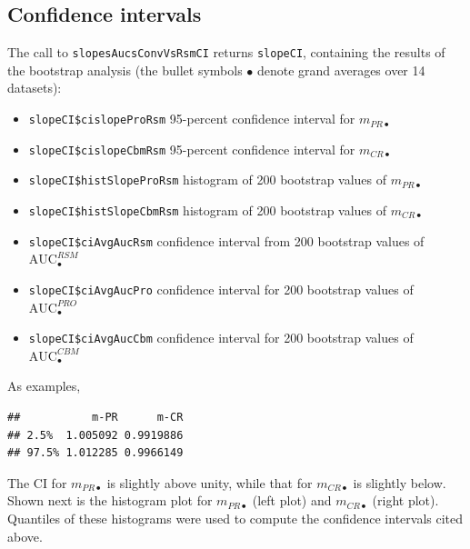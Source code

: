 \documentclass[
]{book}
\providecommand{\tightlist}{%
  \setlength{\itemsep}{0pt}\setlength{\parskip}{0pt}}
\begin{document}
\hypertarget{rsm-3-fits-confidence-intervals}{%
\subsection{Confidence intervals}\label{rsm-3-fits-confidence-intervals}}

The call to \texttt{slopesAucsConvVsRsmCI} returns \texttt{slopeCI}, containing the results of the bootstrap analysis (the bullet symbols \(\bullet\) denote grand averages over 14 datasets):

\begin{itemize}
\tightlist
\item
  \texttt{slopeCI\$cislopeProRsm} 95-percent confidence interval for \(m_{PR \bullet}\)
\item
  \texttt{slopeCI\$cislopeCbmRsm} 95-percent confidence interval for \(m_{CR \bullet}\)
\item
  \texttt{slopeCI\$histSlopeProRsm} histogram of 200 bootstrap values of \(m_{PR \bullet}\)
\item
  \texttt{slopeCI\$histSlopeCbmRsm} histogram of 200 bootstrap values of \(m_{CR \bullet}\)
\item
  \texttt{slopeCI\$ciAvgAucRsm} confidence interval from 200 bootstrap values of \(\text{AUC}^{RSM}_\bullet\)
\item
  \texttt{slopeCI\$ciAvgAucPro} confidence interval for 200 bootstrap values of \(\text{AUC}^{PRO}_\bullet\)
\item
  \texttt{slopeCI\$ciAvgAucCbm} confidence interval for 200 bootstrap values of \(\text{AUC}^{CBM}_\bullet\)
\end{itemize}

As examples,

\begin{verbatim}
##           m-PR      m-CR
## 2.5%  1.005092 0.9919886
## 97.5% 1.012285 0.9966149
\end{verbatim}

The CI for \(m_{PR \bullet}\) is slightly above unity, while that for \(m_{CR \bullet}\) is slightly below. Shown next is the histogram plot for \(m_{PR \bullet}\) (left plot) and \(m_{CR \bullet}\) (right plot). Quantiles of these histograms were used to compute the confidence intervals cited above.
\end{document}
